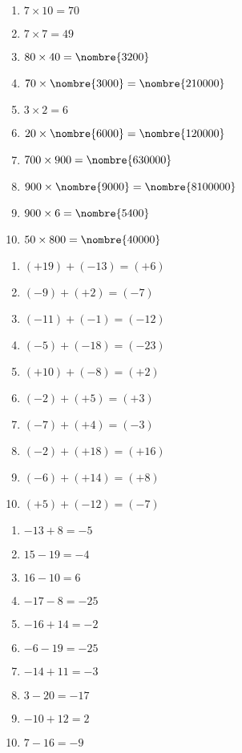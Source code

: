 \documentclass[a4paper,11pt,fleqn]{article}
\begin{document}
\newpage
{}
\begin{correction}\exo{}

\begin{multicols}{2}
\begin{enumerate}
	\item $ 7 \times 10 = 70 $
	\item $ 7 \times 7 = 49 $
	\item $ 80 \times 40 = \nombre{3200} $
	\item $ 70 \times \nombre{3000} = \nombre{210000} $
	\item $ 3 \times 2 = 6 $
	\item $ 20 \times \nombre{6000} = \nombre{120000} $
	\item $ 700 \times 900 = \nombre{630000} $
	\item $ 900 \times \nombre{9000} = \nombre{8100000} $
	\item $ 900 \times 6 = \nombre{5400} $
	\item $ 50 \times 800 = \nombre{40000} $
\end{enumerate}
\end{multicols}

\exo{}

\begin{multicols}{2}
\begin{enumerate}
	\item $ (+19) + (-13) = (+6) $
	\item $ (-9) + (+2) = (-7) $
	\item $ (-11) + (-1) = (-12) $
	\item $ (-5) + (-18) = (-23) $
	\item $ (+10) + (-8) = (+2) $
	\item $ (-2) + (+5) = (+3) $
	\item $ (-7) + (+4) = (-3) $
	\item $ (-2) + (+18) = (+16) $
	\item $ (-6) + (+14) = (+8) $
	\item $ (+5) + (-12) = (-7) $
\end{enumerate}
\end{multicols}

\exo{}

\begin{multicols}{2}
\begin{enumerate}
	\item $ -13+8 = -5 $
	\item $ 15-19 = -4 $
	\item $ 16-10 = 6 $
	\item $ -17-8 = -25 $
	\item $ -16+14 = -2 $
	\item $ -6-19 = -25 $
	\item $ -14+11 = -3 $
	\item $ 3-20 = -17 $
	\item $ -10+12 = 2 $
	\item $ 7-16 = -9 $
\end{enumerate}
\end{multicols}


\end{correction}
\end{document}
